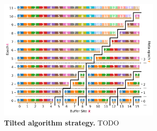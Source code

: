 \begin{figure}
  \centering
  \includegraphics[width=0.7\textwidth]{binder/teeplots/20/surface-size=16+viz=site-reservation-at-ranks-heatmap+ext=}
  \caption{
    \textbf{Tilted algorithm strategy.}
    \footnotesize
    TODO
  }
  \label{fig:hsurf-tilted-intuition}
\end{figure}
